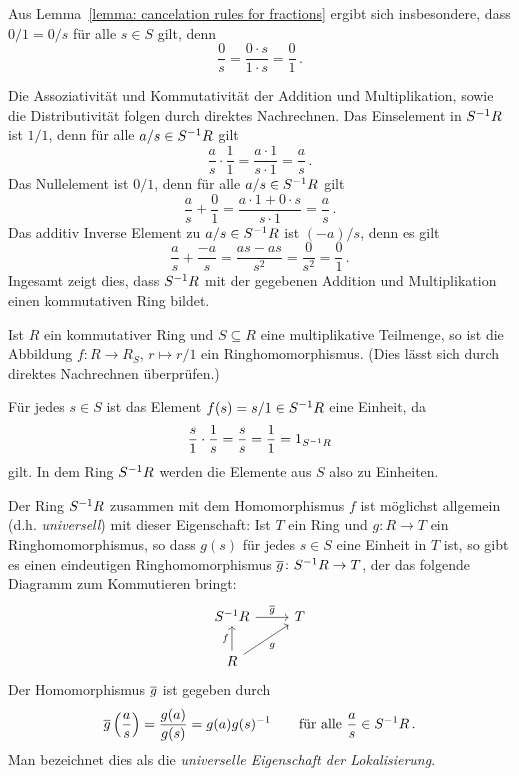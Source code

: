 Aus Lemma~\ref{lemma: cancelation rules for fractions} ergibt sich insbesondere, dass $0/1 = 0/s$ für alle $s \in S$ gilt, denn
\[
    \frac{0}{s}
  = \frac{0 \cdot s}{1 \cdot s}
  = \frac{0}{1} \,.
\]

Die Assoziativität und Kommutativität der Addition und Multiplikation, sowie die Distributivität folgen durch direktes Nachrechnen.
Das Einselement in $\localset{R}{S}$ ist $1/1$, denn für alle $a/s \in \localset{R}{S}$ gilt
\[
    \frac{a}{s} \cdot \frac{1}{1}
  = \frac{a \cdot 1}{s \cdot 1}
  = \frac{a}{s} \,.
\]
Das Nullelement ist $0/1$, denn für alle $a/s \in \localset{R}{S}$ gilt
\[
    \frac{a}{s} + \frac{0}{1}
  = \frac{a \cdot 1 + 0 \cdot s}{s \cdot 1}
  = \frac{a}{s} \,.
\]
Das additiv Inverse Element zu $a/s \in \localset{R}{S}$ ist $(-a)/s$, denn es gilt
\[
    \frac{a}{s} + \frac{-a}{s}
  = \frac{a s - a s}{s^2}
  = \frac{0}{s^2}
  = \frac{0}{1} \,.
\]
Ingesamt zeigt dies, dass $\localset{R}{S}$ mit der gegebenen Addition und Multiplikation einen kommutativen Ring bildet.

\begin{remark}
  \label{remark: universal property of localization}
  Ist $R$ ein kommutativer Ring und $S \subseteq R$ eine multiplikative Teilmenge, so ist die Abbildung $f \colon R \to R_S$, $r \mapsto r/1$ ein Ringhomomorphismus.
  (Dies lässt sich durch direktes Nachrechnen überprüfen.)
  
  Für jedes $s \in S$ ist das Element $f(s) = s/1 \in \localset{R}{S}$ eine Einheit, da
  \[
      \frac{s}{1} \cdot \frac{1}{s}
    = \frac{s}{s}
    = \frac{1}{1}
    = 1_{\localset{R}{S}}
  \]
  gilt.
  In dem Ring $\localset{R}{S}$ werden die Elemente aus $S$ also zu Einheiten.
  
  Der Ring $\localset{R}{S}$ zusammen mit dem Homomorphismus $f$ ist möglichst allgemein (d.h. \emph{universell}) mit dieser Eigenschaft:
  Ist $T$ ein Ring und $g \colon R \to T$ ein Ringhomomorphismus, so dass $g(s)$ für jedes $s \in S$ eine Einheit in $T$ ist, so gibt es einen eindeutigen Ringhomomorphismus $\induced{g} \colon \localset{R}{S} \to T$, der das folgende Diagramm zum Kommutieren bringt:
  \[
    \begin{tikzcd}
        \localset{R}{S}
        \arrow{r}{\induced{g}}
      & T
      \\
        R
        \arrow{u}{f}
        \arrow[swap]{ru}{g}
      & {}
    \end{tikzcd}
  \]
  Der Homomorphismus $\induced{g}$ ist gegeben durch
  \[
      \induced{g}\left( \frac{a}{s} \right)
    = \frac{g(a)}{g(s)}
    = g(a) g(s)^{-1}
    \qquad
    \text{für alle $\frac{a}{s} \in \localset{R}{S}$} \,.
  \]
  Man bezeichnet dies als die \emph{universelle Eigenschaft der Lokalisierung}.
\end{remark}

